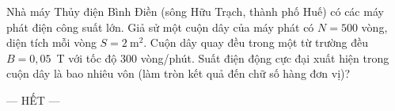 	\begin{ex}%
		Nhà máy Thủy điện Bình Điền (sông Hữu Trạch, thành phố Huế) có các máy phát điện công suất lớn. Giả sử một cuộn dây của máy phát có $N=500$ vòng, diện tích mỗi vòng $S=2~\text{m}^2$. Cuộn dây quay đều trong một từ trường đều $B=0{,}05$~T với tốc độ $300$ vòng/phút. Suất điện động cực đại xuất hiện trong cuộn dây là bao nhiêu vôn (làm tròn kết quả đến chữ số hàng đơn vị)?
		\par
	\end{ex}

	\centerline{--- HẾT ---}


